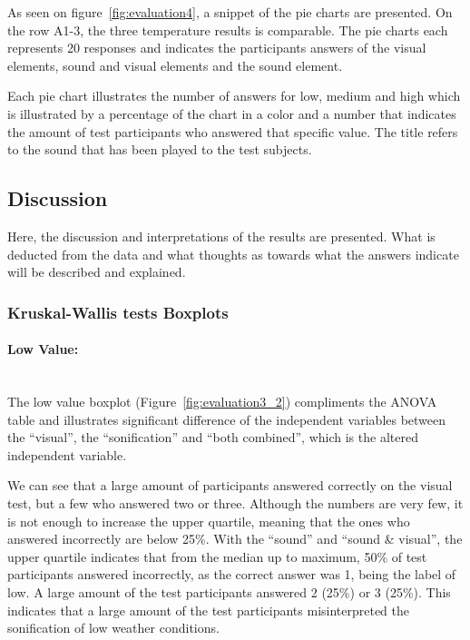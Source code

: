 As seen on figure~\ref{fig:evaluation4}, a snippet of the pie charts are presented. 
On the row A1-3, the three temperature results is comparable. 
The pie charts each represents 20 responses and indicates the participants answers of the visual elements, sound and visual elements and the sound element. 

Each pie chart illustrates the number of answers for low, medium and high which is illustrated by a percentage of the chart in a color and a number that indicates the amount of test participants who answered that specific value. 
The title refers to the sound that has been played to the test subjects.



\FloatBarrier
\subsection{Discussion} %
\label{sub:discussion}

Here, the discussion and interpretations of the results are presented. 
What is deducted from the data and what thoughts as towards what the answers indicate will be described and explained.

\subsubsection{Kruskal-Wallis tests Boxplots} %
\label{ssub:kruskal_wallis_tests_boxplots}

\paragraph{Low Value:} %
\label{par:low_value_}
\hspace{0pt} \\
The low value boxplot (Figure~\ref{fig:evaluation3_2}) compliments the ANOVA table and illustrates significant difference of the independent variables between the \enquote{visual}, the \enquote{sonification} and \enquote{both combined}, which is the altered independent variable.

We can see that a large amount of participants answered correctly on the visual test, but a few who answered two or three. 
Although the numbers are very few, it is not enough to increase the upper quartile, meaning that the ones who answered incorrectly are below 25\%.  
With the \enquote{sound} and \enquote{sound \& visual}, the upper quartile indicates that from the median up to maximum, 50\% of test participants answered incorrectly, as the correct answer was 1, being the label of low. 
A large amount of the test participants answered 2 (25\%) or 3 (25\%). 
This indicates that a large amount of the test participants misinterpreted the sonification of low weather conditions.

